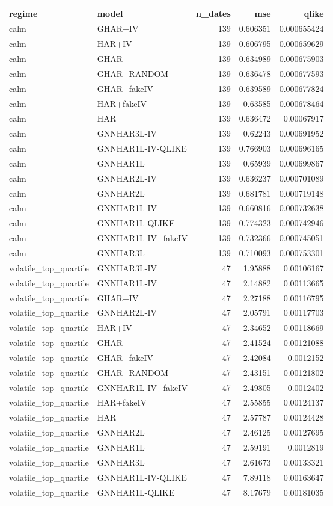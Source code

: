\begin{tabular}{llrrr}
\toprule
regime & model & n_dates & mse & qlike \\
\midrule
calm & GHAR+IV & 139 & 0.606351 & 0.000655424 \\
calm & HAR+IV & 139 & 0.606795 & 0.000659629 \\
calm & GHAR & 139 & 0.634989 & 0.000675903 \\
calm & GHAR_RANDOM & 139 & 0.636478 & 0.000677593 \\
calm & GHAR+fakeIV & 139 & 0.639589 & 0.000677824 \\
calm & HAR+fakeIV & 139 & 0.63585 & 0.000678464 \\
calm & HAR & 139 & 0.636472 & 0.00067917 \\
calm & GNNHAR3L-IV & 139 & 0.62243 & 0.000691952 \\
calm & GNNHAR1L-IV-QLIKE & 139 & 0.766903 & 0.000696165 \\
calm & GNNHAR1L & 139 & 0.65939 & 0.000699867 \\
calm & GNNHAR2L-IV & 139 & 0.636237 & 0.000701089 \\
calm & GNNHAR2L & 139 & 0.681781 & 0.000719148 \\
calm & GNNHAR1L-IV & 139 & 0.660816 & 0.000732638 \\
calm & GNNHAR1L-QLIKE & 139 & 0.774323 & 0.000742946 \\
calm & GNNHAR1L-IV+fakeIV & 139 & 0.732366 & 0.000745051 \\
calm & GNNHAR3L & 139 & 0.710093 & 0.000753301 \\
volatile_top_quartile & GNNHAR3L-IV & 47 & 1.95888 & 0.00106167 \\
volatile_top_quartile & GNNHAR1L-IV & 47 & 2.14882 & 0.00113665 \\
volatile_top_quartile & GHAR+IV & 47 & 2.27188 & 0.00116795 \\
volatile_top_quartile & GNNHAR2L-IV & 47 & 2.05791 & 0.00117703 \\
volatile_top_quartile & HAR+IV & 47 & 2.34652 & 0.00118669 \\
volatile_top_quartile & GHAR & 47 & 2.41524 & 0.00121088 \\
volatile_top_quartile & GHAR+fakeIV & 47 & 2.42084 & 0.0012152 \\
volatile_top_quartile & GHAR_RANDOM & 47 & 2.43151 & 0.00121802 \\
volatile_top_quartile & GNNHAR1L-IV+fakeIV & 47 & 2.49805 & 0.0012402 \\
volatile_top_quartile & HAR+fakeIV & 47 & 2.55855 & 0.00124137 \\
volatile_top_quartile & HAR & 47 & 2.57787 & 0.00124428 \\
volatile_top_quartile & GNNHAR2L & 47 & 2.46125 & 0.00127695 \\
volatile_top_quartile & GNNHAR1L & 47 & 2.59191 & 0.0012819 \\
volatile_top_quartile & GNNHAR3L & 47 & 2.61673 & 0.00133321 \\
volatile_top_quartile & GNNHAR1L-IV-QLIKE & 47 & 7.89118 & 0.00163647 \\
volatile_top_quartile & GNNHAR1L-QLIKE & 47 & 8.17679 & 0.00181035 \\
\bottomrule
\end{tabular}
